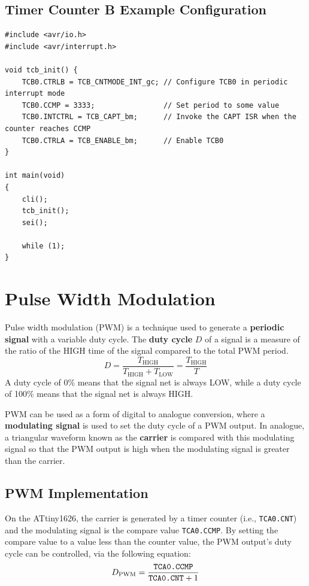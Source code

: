 \documentclass{report}
\begin{document}
\subsection{Timer Counter B Example Configuration}
\begin{verbatim}
#include <avr/io.h>
#include <avr/interrupt.h>

void tcb_init() {
    TCB0.CTRLB = TCB_CNTMODE_INT_gc; // Configure TCB0 in periodic interrupt mode
    TCB0.CCMP = 3333;                // Set period to some value
    TCB0.INTCTRL = TCB_CAPT_bm;      // Invoke the CAPT ISR when the counter reaches CCMP
    TCB0.CTRLA = TCB_ENABLE_bm;      // Enable TCB0
}

int main(void)
{
    cli();
    tcb_init();
    sei();

    while (1);
}
\end{verbatim}
\section{Pulse Width Modulation}
Pulse width modulation (PWM) is a technique used to generate a \textbf{periodic signal}
with a variable duty cycle. The \textbf{duty cycle} \(D\) of a signal
is a measure of the ratio of the HIGH time of the signal compared to the total PWM period.
\begin{equation*}
    D = \frac{T_\mathrm{HIGH}}{T_\mathrm{HIGH} + T_\mathrm{LOW}} = \frac{T_\mathrm{HIGH}}{T}
\end{equation*}
A duty cycle of 0\% means that the signal net is always LOW, while a duty cycle of 100\%
means that the signal net is always HIGH\@.

PWM can be used as a form of digital to analogue conversion, where a \textbf{modulating signal}
is used to set the duty cycle of a PWM output. In analogue, a triangular waveform known as the \textbf{carrier}
is compared with this modulating signal so that the PWM output is high when the modulating signal is greater than the carrier.
\subsection{PWM Implementation}
On the ATtiny1626, the carrier is generated by a timer counter (i.e., \texttt{TCA0.CNT}) and the modulating signal
is the compare value \texttt{TCA0.CCMP}. By setting the compare value to a value less than the counter value,
the PWM output's duty cycle can be controlled, via the following equation:
\begin{equation*}
    D_\mathrm{PWM} = \frac{\text{\texttt{TCA0.CCMP}}}{\text{\texttt{TCA0.CNT}} + 1}
\end{equation*}
\end{document}
